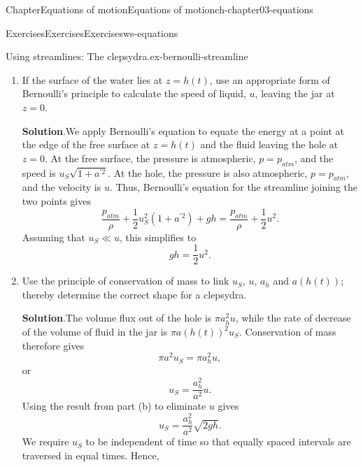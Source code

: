 \documentclass[oneside,10pt,]{book}
\newcommand{\blocktitlefont}{\relax}
\numberwithin{equation}{section}
\newcommand{\pd}[2]{\frac{\partial#1}{\partial#2}}
\newcommand{\bn}{\boldsymbol{n}}
\newcommand{\bu}{\boldsymbol{u}}
\begin{document}
\begin{chapterptx}{Chapter}{Equations of motion}{}{Equations of motion}{}{}{ch-chapter03-equations}
\begin{exercises-section}{Exercises}{Exercises}{}{Exercises}{}{}{ws-equations}
\begin{divisionexercise}{8}{Using streamlines: The clepsydra.}{}{ex-bernoulli-streamline}
\begin{enumerate}[font=\bfseries,label=(\alph*),ref=\alph*]
\begin{equation*}
\bu \cdot \bn = u_r - u_z \pd{a}{z} = 0.
\end{equation*}
This is precisely the condition for \(r = a(z)\) to be a streamline.%
\item{}If the surface of the water lies at \(z = h(t)\), use an appropriate form of Bernoulli’s principle to calculate the speed of liquid, \(u\), leaving the jar at \(z = 0\).%
\par
[You may assume that the desired surface speed \(u_S = |\dot{h}| \ll u\), so that the flow is approximately steady and that the fluid pressure is atmospheric at \(z = 0\).]%
\par\smallskip%
\noindent\textbf{\blocktitlefont Solution}.\hypertarget{ex-bernoulli-streamline-4-2}{}\quad{}We apply Bernoulli's equation to equate the energy at a point at the edge of the free surface at \(z = h(t)\) and the fluid leaving the hole at \(z = 0\). At the free surface, the pressure is atmospheric, \(p = p_{atm}\), and the speed is \(u_S\sqrt{1+a^{'2}}\). At the hole, the pressure is also atmospheric, \(p = p_{atm}\), and the velocity is \(u\). Thus, Bernoulli's equation for the streamline joining the two points gives%
\begin{equation*}
\frac{p_{atm}}{\rho} + \frac12 u_S^2(1+a^{'2}) + gh = \frac{p_{atm}}{\rho} + \frac12 u^2.
\end{equation*}
Assuming that \(u_S \ll u\), this simplifies to%
\begin{equation*}
gh = \frac12 u^2.
\end{equation*}
%
\item{}Use the principle of conservation of mass to link \(u_S\), \(u\), \(a_h\) and \(a(h(t))\); thereby determine the correct shape for a clepsydra.%
\par\smallskip%
\noindent\textbf{\blocktitlefont Solution}.\hypertarget{ex-bernoulli-streamline-5-2}{}\quad{}The volume flux out of the hole is \(\pi a_h^2 u\), while the rate of decrease of the volume of fluid in the jar is \(\pi a(h(t))^2 u_S\). Conservation of mass therefore gives%
\begin{equation*}
\pi a^2 u_S = \pi a_h^2 u,
\end{equation*}
or%
\begin{equation*}
u_S = \frac{a_h^2}{a^2}u.
\end{equation*}
Using the result from part (b) to eliminate \(u\) gives%
\begin{equation*}
u_S = \frac{a_h^2}{a^2}\sqrt{2gh}.
\end{equation*}
We require \(u_S\) to be independent of time so that equally spaced intervals are traversed in equal times. Hence,%

\end{enumerate}
\end{divisionexercise}
\end{exercises-section}
\end{chapterptx}
\end{document}
